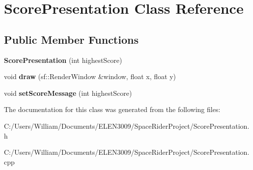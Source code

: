 \hypertarget{class_score_presentation}{}\section{Score\+Presentation Class Reference}
\label{class_score_presentation}
\subsection*{Public Member Functions}
\begin{DoxyCompactItemize}
\item 
\mbox{\label{class_score_presentation_ac12ced2076cf8686e0e2319cb8852875}} 
{\bfseries Score\+Presentation} (int highest\+Score)
\item 
\mbox{\label{class_score_presentation_af0e8b8532f70ae4a1d4a0a7ca473ff0f}} 
void {\bfseries draw} (sf\+::\+Render\+Window \&window, float x, float y)
\item 
\mbox{\label{class_score_presentation_adf2c954da3e73d5adbe0e8d30243ee25}} 
void {\bfseries set\+Score\+Message} (int highest\+Score)
\end{DoxyCompactItemize}


The documentation for this class was generated from the following files\+:\begin{DoxyCompactItemize}
\item 
C\+:/\+Users/\+William/\+Documents/\+E\+L\+E\+N3009/\+Space\+Rider\+Project/Score\+Presentation.\+h\item 
C\+:/\+Users/\+William/\+Documents/\+E\+L\+E\+N3009/\+Space\+Rider\+Project/Score\+Presentation.\+cpp\end{DoxyCompactItemize}
